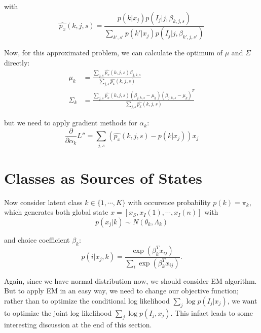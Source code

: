 \documentclass[english]{article}
\begin{document}
\noindent with
\begin{equation}\nonumber
    \hat{p_x}(k,j,s) = \frac{p(k|x_j)p(I_j|j,\beta_{k,j,s})}{\sum_{k',s'}p(k'|x_j)p(I_j|j,\beta_{k',j,s'})}
\end{equation}

Now, for this approximated problem, we can calculate the optimum of $\mu$ and $\Sigma$ directly:
\begin{equation}\nonumber
  \begin{aligned}
    \mu_k & = \frac{\sum_{j,s}\hat{p_x}(k,j,s)\beta_{j,k,s}}{\sum_{j,s}\hat{p_x}(k,j,s)}\\
    \Sigma_k & = \frac{\sum_{j,s}\hat{p_x}(k,j,s)(\beta_{j,k,s}-\mu_k)(\beta_{j,k,s}-\mu_k)^T}{\sum_{j,s}\hat{p_x}(k,j,s)}
  \end{aligned}
\end{equation}

\noindent but we need to apply gradient methods for $\alpha_k$:
\begin{equation}\nonumber
  \frac{\partial}{\partial \alpha_k}L'' = \sum_{j,s} (\hat{p_x}(k,j,s) - p(k|x_j))x_j
\end{equation}






\section{Classes as Sources of States}

Now consider latent class $k\in\{1,\cdots,K\}$ with occurence probability $p(k)=\pi_k$, which generates both global state $x = [x_S,x_I(1),\cdots,x_I(n)]$ with
\begin{equation}\nonumber
  p(x_j|k) \sim N(\theta_k,\Lambda_k)
\end{equation}

\noindent and choice coefficient $\beta_k$:
\begin{equation}\nonumber
  p(i|x_j,k) = \frac{\exp(\beta_k^Tx_{ij})}{\sum_i\exp(\beta_k^Tx_{ij})}.
\end{equation}

Again, since we have normal distribution now, we should consider EM algorithm. But to apply EM in an easy way, we need to change our objective function; rather than to optimize the conditional log likelihood $\sum_j\log p(I_j|x_j)$, we want to optimize the joint log likelihood $\sum_j\log p(I_j,x_j)$. This infact leads to some interesting discussion at the end of this section.
\end{document}
